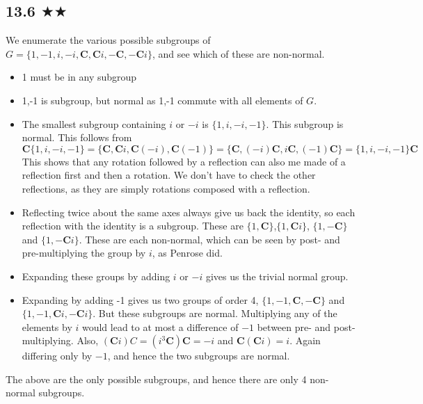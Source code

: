 \subsection{13.6 $\bigstar \bigstar $}
We enumerate the various possible subgroups of $G=\{1,-1,i,-i,\mathbf{C},\mathbf{C}i,-\mathbf{C},-\mathbf{C}i\}$, and see which of these are non-normal. 
\begin{itemize}
\item 1 must be in any subgroup
\item {1,-1} is subgroup, but normal as 1,-1 commute with all elements of $G$.
\item The smallest subgroup containing $i$ or $-i$ is $\{1,i,-i,-1\}$. This subgroup is normal. This follows from $$\mathbf{C}\{1,i,-i,-1\}=\{\mathbf{C},\mathbf{C}i,\mathbf{C}(-i),\mathbf{C}(-1)\}=\{\mathbf{C},(-i)\mathbf{C},i\mathbf{C},(-1)\mathbf{C}\}=\{1,i,-i,-1\}\mathbf{C}$$
This shows that any rotation followed by a reflection can also me made of a reflection first and then a rotation. We don't have to check the other reflections, as they are simply rotations composed with a reflection. 
\item Reflecting twice about the same axes always give us back the identity, so each reflection with the identity is a subgroup. These are $\{1, \mathbf{C}\}$,$\{1, \mathbf{C}i\}$, $\{1, -\mathbf{C}\}$ and $\{1, -\mathbf{C}i\}$. These are each non-normal, which can be seen by post- and pre-multiplying the group by $i$, as Penrose did.
\item Expanding these groups by adding $i$ or $-i$ gives us the trivial normal group.
\item Expanding by adding -1 gives us two groups of order 4, $\{1,-1, \mathbf{C},-\mathbf{C}\}$ and $\{1,-1, \mathbf{C}i,-\mathbf{C}i\}$. But these subgroups are normal. Multiplying any of the elements by $i$ would lead to at most a difference of $-1$ between pre- and post-multiplying. Also, $(\mathbf{C}i)C=(i^3\mathbf{C})\mathbf{C}=-i$ and $\mathbf{C}(\mathbf{C}i)=i$. Again differing only by $-1$, and hence the two subgroups are normal.  
\end{itemize}
The above are the only possible subgroups, and hence there are only 4 non-normal subgroups.


